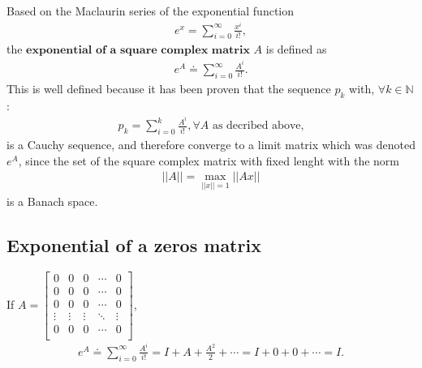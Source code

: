 \documentclass[letterpaper,10pt,english]{jupyterBook}
\begin{document}
\sphinxAtStartPar
Based on the Maclaurin series of the exponential function
\begin{equation*}
\begin{split}
    e^x = \sum_{i=0}^{\infty} \frac{x^i}{i!},
\end{split}
\end{equation*}
\sphinxAtStartPar
the \(\textbf{exponential of a square complex matrix }A\) is defined as
\begin{equation*}
\begin{split}
    e^A \doteq \sum_{i=0}^{\infty} \frac{A^i}{i!}.
\end{split}
\end{equation*}
\sphinxAtStartPar
This is well defined because it has been proven that the sequence \({p_k}\) with, \(\forall k \in \mathbb{N}\):
\begin{equation*}
\begin{split}
    p_k = \sum_{i=0}^{k} \frac{A^i}{i!}, \forall A \text{ as decribed above,}
\end{split}
\end{equation*}
\sphinxAtStartPar
is a Cauchy sequence, and therefore converge to a limit matrix which was denoted \(e^A\), since the set of the square complex matrix with fixed lenght with the norm
\begin{equation*}
\begin{split}
||A|| = \max_{||x||=1} ||Ax||
\end{split}
\end{equation*}
\sphinxAtStartPar
is a Banach space.


\subsection{Exponential of a zeros matrix}
\label{\detokenize{appendix:exponential-of-a-zeros-matrix}}
\sphinxAtStartPar
If \(A =   
\left[ {\begin{array}{ccccc}
    0 & 0 & 0 & \dotsm & 0\\
    0 & 0 & 0 & \dotsm & 0\\
    0 & 0 & 0 & \dotsm & 0\\
    \vdots & \vdots & \vdots & \ddots & \vdots\\
    0 & 0 & 0 & \dotsm & 0\\
\end{array} } \right] \),
\begin{equation*}
\begin{split}
    e^A \doteq \sum_{i=0}^{\infty} \frac{A^i}{i!} = I + A + \frac{A^2}{2} + \dotsm = I + 0 + 0 + \dotsm = I.
\end{split}
\end{equation*}
\end{document}
